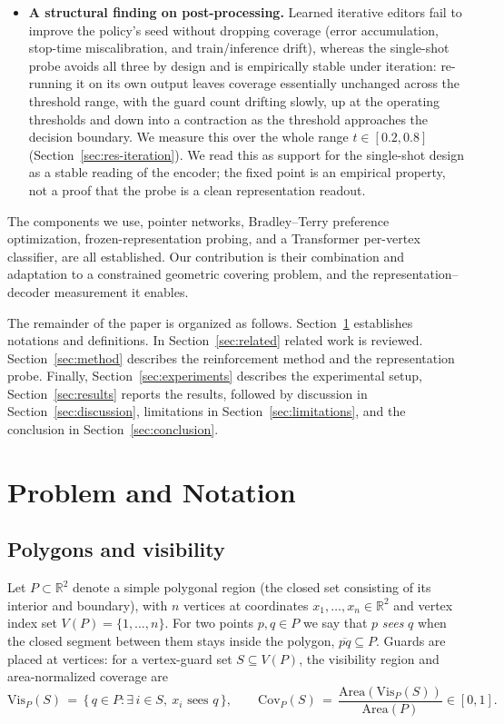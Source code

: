 \documentclass[11pt]{article}
\newcommand{\Vis}[1]{\mathrm{Vis}_P(#1)}
\newcommand{\Covf}[1]{\mathrm{Cov}_P(#1)}
\newcommand{\Area}[1]{\mathrm{Area}(#1)}
\begin{document}
\begin{itemize}
  \item[\textbf{C4}] \textbf{A structural finding on post-processing.} Learned iterative editors fail to improve the policy's seed without dropping coverage (error accumulation, stop-time miscalibration, and train/inference drift), whereas the single-shot probe avoids all three by design and is empirically stable under iteration: re-running it on its own output leaves coverage essentially unchanged across the threshold range, with the guard count drifting slowly, up at the operating thresholds and down into a contraction as the threshold approaches the decision boundary. We measure this over the whole range $t \in [0.2, 0.8]$ (Section~\ref{sec:res-iteration}). We read this as support for the single-shot design as a stable reading of the encoder; the fixed point is an empirical property, not a proof that the probe is a clean representation readout.
\end{itemize}
The components we use, pointer networks, Bradley--Terry preference optimization, frozen-representation probing, and a Transformer per-vertex classifier, are all established. Our contribution is their combination and adaptation to a constrained geometric covering problem, and the representation--decoder measurement it enables.

The remainder of the paper is organized as follows. Section~\ref{sec:problem} establishes notations and definitions. In Section~\ref{sec:related} related work is reviewed. Section~\ref{sec:method} describes the reinforcement method and the representation probe. Finally, Section~\ref{sec:experiments} describes the experimental setup, Section~\ref{sec:results} reports the results, followed by discussion in Section~\ref{sec:discussion}, limitations in Section~\ref{sec:limitations}, and the conclusion in Section~\ref{sec:conclusion}.

\section{Problem and Notation}
\label{sec:problem}

\subsection{Polygons and visibility}
\label{sec:problem-polygon}

Let $P \subset \mathbb{R}^2$ denote a simple polygonal region (the closed set consisting of its interior and boundary), with $n$ vertices at coordinates $x_1, \dots, x_n \in \mathbb{R}^2$ and vertex index set $V(P) = \{1, \dots, n\}$. For two points $p,q\in P$  we say that $p$ \emph{sees} $q$ when the closed segment between them stays inside the polygon, $\overline{pq} \subseteq P$. Guards are placed at vertices: for a vertex-guard set $S \subseteq V(P)$, the visibility region and area-normalized coverage are
\begin{equation}
\Vis{S} \,=\, \{\, q \in P : \exists\, i \in S,\ x_i \text{ sees } q \,\},
\qquad
\Covf{S} \,=\, \frac{\Area{\Vis{S}}}{\Area{P}} \in [0,1].
\label{eq:vis-cov}
\end{equation}
\end{document}
